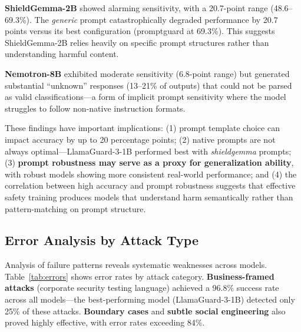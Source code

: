 \documentclass{article}
\begin{document}
\textbf{ShieldGemma-2B} showed alarming sensitivity, with a 20.7-point range (48.6--69.3\%). The \textit{generic} prompt catastrophically degraded performance by 20.7 points versus its best configuration (promptguard at 69.3\%). This suggests ShieldGemma-2B relies heavily on specific prompt structures rather than understanding harmful content.

\textbf{Nemotron-8B} exhibited moderate sensitivity (6.8-point range) but generated substantial ``unknown'' responses (13--21\% of outputs) that could not be parsed as valid classifications---a form of implicit prompt sensitivity where the model struggles to follow non-native instruction formats.

These findings have important implications: (1) prompt template choice can impact accuracy by up to 20 percentage points; (2) native prompts are not always optimal---LlamaGuard-3-1B performed best with \textit{shieldgemma} prompts; (3) \textbf{prompt robustness may serve as a proxy for generalization ability}, with robust models showing more consistent real-world performance; and (4) the correlation between high accuracy and prompt robustness suggests that effective safety training produces models that understand harm semantically rather than pattern-matching on prompt structure.

\subsection{Error Analysis by Attack Type}
Analysis of failure patterns reveals systematic weaknesses across models. Table~\ref{tab:errors} shows error rates by attack category. \textbf{Business-framed attacks} (corporate security testing language) achieved a 96.8\% success rate across all models---the best-performing model (LlamaGuard-3-1B) detected only 25\% of these attacks. \textbf{Boundary cases} and \textbf{subtle social engineering} also proved highly effective, with error rates exceeding 84\%.
\end{document}
